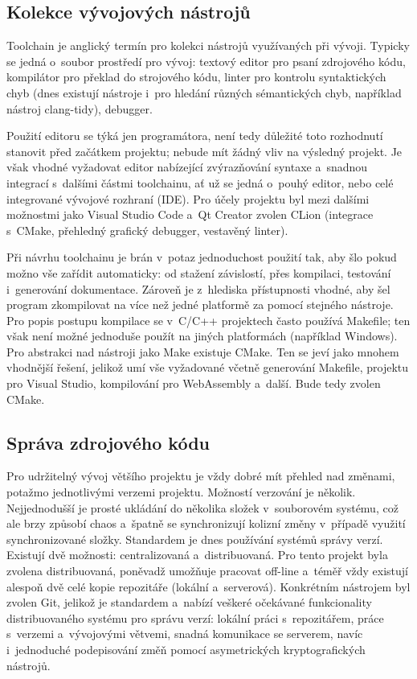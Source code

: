 \subsection{Kolekce vývojových nástrojů}
\begin{definition}[Toolchain]
	Toolchain je anglický termín pro kolekci nástrojů využívaných při vývoji. Typicky se jedná o~soubor prostředí pro vývoj: textový editor pro psaní zdrojového kódu, kompilátor pro překlad do strojového kódu, linter pro kontrolu syntaktických chyb (dnes existují nástroje i~pro hledání různých sémantických chyb, například nástroj clang-tidy), debugger.
\end{definition}

Použití editoru se týká jen programátora, není tedy důležité toto rozhodnutí stanovit před začátkem projektu; nebude mít žádný vliv na výsledný projekt. Je však vhodné vyžadovat editor nabízející zvýrazňování syntaxe a~snadnou integrací s~dalšími částmi toolchainu, ať už se jedná o~pouhý editor, nebo celé integrované vývojové rozhraní (IDE). Pro účely projektu byl mezi dalšími možnostmi jako Visual Studio Code a~Qt Creator zvolen CLion (integrace s~CMake, přehledný grafický debugger, vestavěný linter).

Při návrhu toolchainu je brán v~potaz jednoduchost použití tak, aby šlo pokud možno vše zařídit automaticky: od stažení závislostí, přes kompilaci, testování i~generování dokumentace. Zároveň je z~hlediska přístupnosti vhodné, aby šel program zkompilovat na více než jedné platformě za pomocí stejného nástroje. Pro popis postupu kompilace se v~C/C++ projektech často používá Makefile; ten však není možné jednoduše použít na jiných platformách (například Windows). Pro abstrakci nad nástroji jako Make existuje CMake. Ten se jeví jako mnohem vhodnější řešení, jelikož umí vše vyžadované včetně generování Makefile, projektu pro Visual Studio, kompilování pro WebAssembly a~další. Bude tedy zvolen CMake.

\subsection{Správa zdrojového kódu}
Pro udržitelný vývoj většího projektu je vždy dobré mít přehled nad změnami, potažmo jednotlivými verzemi projektu. Možností verzování je několik. Nejjednodušší je prosté ukládání do několika složek v~souborovém systému, což ale brzy způsobí chaos a~špatně se synchronizují kolizní změny v~případě využití synchronizované složky. Standardem je dnes používání systémů správy verzí. Existují dvě možnosti: centralizovaná a~distribuovaná. Pro tento projekt byla zvolena distribuovaná, poněvadž umožňuje pracovat off-line a~téměř vždy existují alespoň dvě celé kopie repozitáře (lokální a~serverová). Konkrétním nástrojem byl zvolen Git, jelikož je standardem a~nabízí veškeré očekávané funkcionality distribuovaného systému pro správu verzí: lokální práci s~repozitářem, práce s~verzemi a~vývojovými větvemi, snadná komunikace se serverem, navíc i~jednoduché podepisování změň pomocí asymetrických kryptografických nástrojů.

